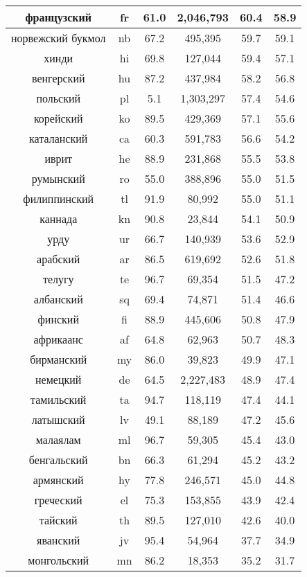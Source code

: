 \begin{table*}
{\begin{tabular}{|c|c|c||c|c|c|}
французский & fr & 61.0 & 2,046,793 & 60.4 & 58.9\\ \hline
норвежский букмол & nb & 67.2 & 495,395 & 59.7 & 59.1\\ \hline
хинди & hi & 69.8 & 127,044 & 59.4 & 57.1\\ \hline
венгерский & hu & 87.2 & 437,984 & 58.2 & 56.8\\ \hline
польский & pl & 5.1 & 1,303,297 & 57.4 & 54.6\\ \hline
корейский & ko & 89.5 & 429,369 & 57.1 & 55.6\\ \hline
каталанский & ca & 60.3 & 591,783 & 56.6 & 54.2\\ \hline
иврит & he & 88.9 & 231,868 & 55.5 & 53.8\\ \hline
румынский & ro & 55.0 & 388,896 & 55.0 & 51.5\\ \hline
филиппинский & tl & 91.9 & 80,992 & 55.0 & 51.1\\ \hline
каннада & kn & 90.8 & 23,844 & 54.1 & 50.9\\ \hline
урду & ur & 66.7 & 140,939 & 53.6 & 52.9\\ \hline
арабский & ar & 86.5 & 619,692 & 52.6 & 51.8\\ \hline
телугу & te & 96.7 & 69,354 & 51.5 & 47.2\\ \hline
албанский & sq & 69.4 & 74,871 & 51.4 & 46.6\\ \hline
финский & fi & 88.9 & 445,606 & 50.8 & 47.9\\ \hline
африкаанс & af & 64.8 & 62,963 & 50.7 & 48.3\\ \hline
бирманский & my & 86.0 & 39,823 & 49.9 & 47.1\\ \hline
немецкий & de & 64.5 & 2,227,483 & 48.9 & 47.4\\ \hline
тамильский & ta & 94.7 & 118,119 & 47.4 & 44.1\\ \hline
латышский & lv & 49.1 & 88,189 & 47.2 & 45.6\\ \hline
малаялам & ml & 96.7 & 59,305 & 45.4 & 43.0\\ \hline
бенгальский & bn & 66.3 & 61,294 & 45.2 & 43.2\\ \hline
армянский & hy & 77.8 & 246,571 & 45.0 & 44.8\\ \hline
греческий & el & 75.3 & 153,855 & 43.9 & 42.4\\ \hline
тайский & th & 89.5 & 127,010 & 42.6 & 40.0\\ \hline
яванский & jv & 95.4 & 54,964 & 37.7 & 34.9\\ \hline
монгольский & mn & 86.2 & 18,353 & 35.2 & 31.7\\ \hline

\end{tabular}}
\end{table*}
